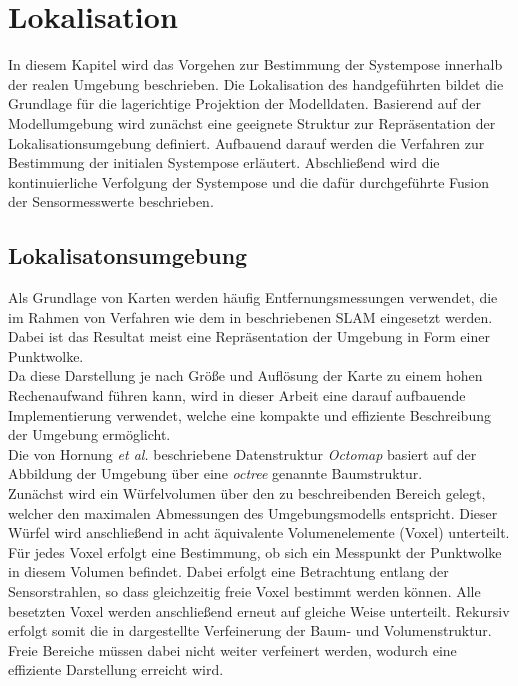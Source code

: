 \chapter{Lokalisation}
\label{chap.loc}
\prever{
}

In diesem Kapitel wird das Vorgehen zur Bestimmung der Systempose innerhalb der realen Umgebung beschrieben. Die Lokalisation des handgeführten  bildet die Grundlage für die lagerichtige Projektion der Modelldaten. Basierend auf der Modellumgebung wird zunächst eine geeignete Struktur zur Repräsentation der Lokalisationsumgebung definiert. Aufbauend darauf werden die Verfahren zur Bestimmung der initialen Systempose erläutert. Abschließend wird die kontinuierliche Verfolgung der Systempose und die dafür durchgeführte Fusion der Sensormesswerte beschrieben.

\section{Lokalisatonsumgebung}
\label{chap.map}
Als Grundlage von Karten werden häufig Entfernungsmessungen verwendet, die im Rahmen von Verfahren wie dem in  beschriebenen SLAM eingesetzt werden. Dabei ist das Resultat meist eine Repräsentation der Umgebung in Form einer Punktwolke.\\
Da diese Darstellung je nach Größe und Auflösung der Karte zu einem hohen Rechenaufwand führen kann, wird in dieser Arbeit eine darauf aufbauende Implementierung \cite{Octomap} verwendet, welche eine kompakte und effiziente Beschreibung der Umgebung ermöglicht.\\

Die von Hornung \textit{et al.} \cite{Hornung2013} beschriebene Datenstruktur \textit{Octomap} basiert auf der Abbildung der Umgebung über eine \textit{octree} genannte Baumstruktur.\\
Zunächst wird ein Würfelvolumen über den zu beschreibenden Bereich gelegt, welcher den maximalen Abmessungen des Umgebungsmodells entspricht. Dieser Würfel wird anschließend in acht äquivalente Volumenelemente (Voxel) unterteilt. Für jedes Voxel erfolgt eine Bestimmung, ob sich ein Messpunkt der Punktwolke in diesem Volumen befindet. Dabei erfolgt eine Betrachtung entlang der Sensorstrahlen, so dass gleichzeitig freie Voxel bestimmt werden können. Alle besetzten Voxel werden anschließend erneut auf gleiche Weise unterteilt. Rekursiv erfolgt somit die in  dargestellte Verfeinerung der Baum- und Volumenstruktur. Freie Bereiche müssen dabei nicht weiter verfeinert werden, wodurch eine effiziente Darstellung erreicht wird.\\

